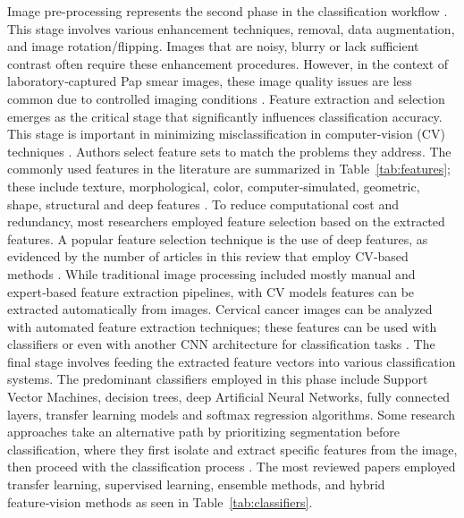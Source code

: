 \documentclass{svjour3}
\begin{document}
Image pre-processing represents the second phase in the classification workflow \cite{ref12}. This stage involves various enhancement techniques, removal, data augmentation, and image rotation/flipping. Images that are noisy, blurry or lack sufficient contrast often require these enhancement procedures. However, in the context of laboratory‑captured Pap smear images, these image quality issues are less common due to controlled imaging conditions \cite{ref21}.
Feature extraction and selection emerges as the critical stage that significantly influences classification accuracy. This stage is important in minimizing misclassification in computer‑vision (CV) techniques \cite{ref33}. Authors select feature sets to match the problems they address. The commonly used features in the literature are summarized in Table~\ref{tab:features}; these include texture, morphological, color, computer‑simulated, geometric, shape, structural and deep features \cite{ref34,ref35}. To reduce computational cost and redundancy, most researchers employed feature selection based on the extracted features. A popular feature selection technique is the use of deep features, as evidenced by the number of articles in this review that employ CV‑based methods \cite{ref36,ref37}. While traditional image processing included mostly manual and expert‑based feature extraction pipelines, with CV models features can be extracted automatically from images. Cervical cancer images can be analyzed with automated feature extraction techniques; these features can be used with classifiers or even with another CNN architecture for classification tasks \cite{ref38,ref39,ref40}.
The final stage involves feeding the extracted feature vectors into various classification systems. The predominant classifiers employed in this phase include Support Vector Machines, decision trees, deep Artificial Neural Networks, fully connected layers, transfer learning models and softmax regression algorithms. Some research approaches take an alternative path by prioritizing segmentation before classification, where they first isolate and extract specific features from the image, then proceed with the classification process \cite{ref41}. The most reviewed papers employed transfer learning, supervised learning, ensemble methods, and hybrid feature‑vision methods as seen in Table~\ref{tab:classifiers}.
\end{document}

